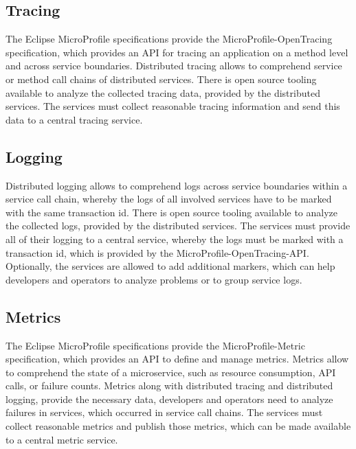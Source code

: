 \subsection{Tracing}
\label{sec:esboc-aspects-tracing}
The Eclipse MicroProfile specifications provide the MicroProfile-OpenTracing specification, which provides an API for tracing an application on a method level and across service boundaries. Distributed tracing allows to comprehend service or method call chains of distributed services. There is open source tooling available to analyze the collected tracing data, provided by the distributed services. The services must collect reasonable tracing information and send this data to a central tracing service\cite{CNCFOpentracing2018}.

\subsection{Logging}
\label{sec:esboc-aspects-logging}
Distributed logging allows to comprehend logs across service boundaries within a service call chain, whereby the logs of all involved services have to be marked with the same transaction id. There is open source tooling available to analyze the collected logs, provided by the distributed services. The services must provide all of their logging to a central service, whereby the logs must be marked with a transaction id, which is provided by the MicroProfile-OpenTracing-API. Optionally, the services are allowed to add additional markers, which can help developers and operators to analyze problems or to group service logs.

\subsection{Metrics}
\label{sec:esboc-aspects-metrics}
The Eclipse MicroProfile specifications provide the MicroProfile-Metric specification, which provides an API to define and manage metrics. Metrics allow to comprehend the state of a microservice, such as resource consumption, API calls, or failure counts. Metrics along with distributed tracing and distributed logging, provide the necessary data, developers and operators need to analyze failures in services, which occurred in service call chains. The services must collect reasonable metrics and publish those metrics, which can be made available to a central metric service\cite{EclipseMicroprofileMetrics2018}.

